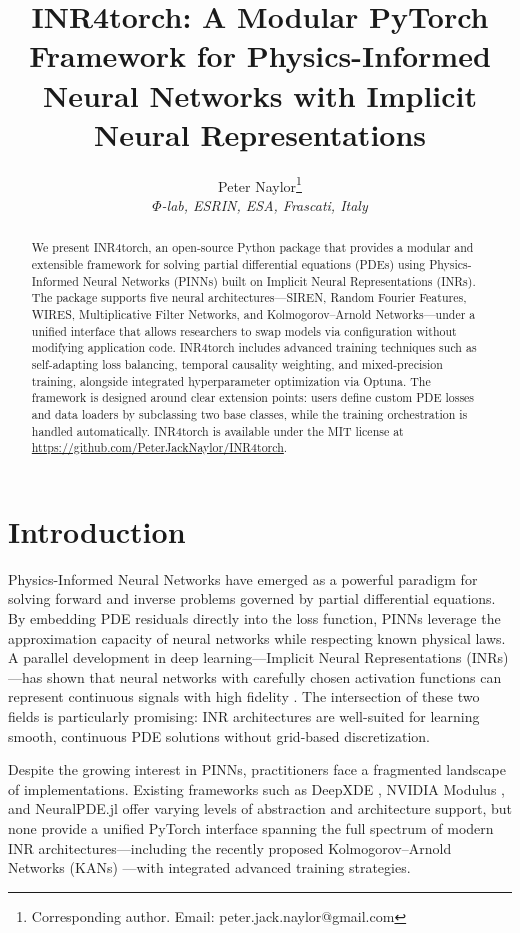 \documentclass[11pt,a4paper]{article}
\title{INR4torch: A Modular PyTorch Framework for Physics-Informed Neural Networks with Implicit Neural Representations}
\author{Peter Naylor\thanks{Corresponding author. Email: peter.jack.naylor@gmail.com}\\
\textit{$\Phi$-lab, ESRIN, ESA, Frascati, Italy}}
\date{}
\begin{document}
\maketitle

\begin{abstract}
We present INR4torch, an open-source Python package that provides a modular and extensible framework for solving partial differential equations (PDEs) using Physics-Informed Neural Networks (PINNs) built on Implicit Neural Representations (INRs). The package supports five neural architectures---SIREN, Random Fourier Features, WIRES, Multiplicative Filter Networks, and Kolmogorov--Arnold Networks---under a unified interface that allows researchers to swap models via configuration without modifying application code. INR4torch includes advanced training techniques such as self-adapting loss balancing, temporal causality weighting, and mixed-precision training, alongside integrated hyperparameter optimization via Optuna. The framework is designed around clear extension points: users define custom PDE losses and data loaders by subclassing two base classes, while the training orchestration is handled automatically. INR4torch is available under the MIT license at \url{https://github.com/PeterJackNaylor/INR4torch}.
\end{abstract}

\section{Introduction}

Physics-Informed Neural Networks \citep{raissi2019physics} have emerged as a powerful paradigm for solving forward and inverse problems governed by partial differential equations. By embedding PDE residuals directly into the loss function, PINNs leverage the approximation capacity of neural networks while respecting known physical laws. A parallel development in deep learning---Implicit Neural Representations (INRs)---has shown that neural networks with carefully chosen activation functions can represent continuous signals with high fidelity \citep{sitzmann2020implicit, tancik2020fourier}. The intersection of these two fields is particularly promising: INR architectures are well-suited for learning smooth, continuous PDE solutions without grid-based discretization.

Despite the growing interest in PINNs, practitioners face a fragmented landscape of implementations. Existing frameworks such as DeepXDE \citep{lu2021deepxde}, NVIDIA Modulus \citep{modulus2023}, and NeuralPDE.jl \citep{neuralpde2021} offer varying levels of abstraction and architecture support, but none provide a unified PyTorch interface spanning the full spectrum of modern INR architectures---including the recently proposed Kolmogorov--Arnold Networks (KANs) \citep{liu2024kan}---with integrated advanced training strategies.
\end{document}
